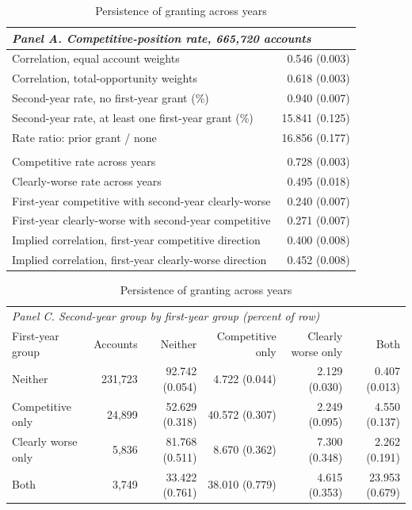 \begin{table}[!htbp]
\centering
\caption{Persistence of granting across years}
\label{tab:persistence}
\begin{threeparttable}
\footnotesize
\begin{tabular}{p{}r}
\toprule
\multicolumn{2}{l}{\textit{Panel A. Competitive-position rate, 665,720 accounts}} \\
\midrule
Correlation, equal account weights & 0.546 (0.003) \\
Correlation, total-opportunity weights & 0.618 (0.003) \\
Second-year rate, no first-year grant (\%) & 0.940 (0.007) \\
Second-year rate, at least one first-year grant (\%) & 15.841 (0.125) \\
Rate ratio: prior grant / none & 16.856 (0.177) \\
\addlinespace
\multicolumn{2}{l}{\textit{Panel B. By board state, 266,207 accounts}} \\
Competitive rate across years & 0.728 (0.003) \\
Clearly-worse rate across years & 0.495 (0.018) \\
First-year competitive with second-year clearly-worse & 0.240 (0.007) \\
First-year clearly-worse with second-year competitive & 0.271 (0.007) \\
Implied correlation, first-year competitive direction & 0.400 (0.008) \\
Implied correlation, first-year clearly-worse direction & 0.452 (0.008) \\
\bottomrule
\end{tabular}
\medskip
\begin{tabular}{lrrrrr}
\toprule
\multicolumn{6}{l}{\textit{Panel C. Second-year group by first-year group (percent of row)}} \\
First-year group & Accounts & Neither & Competitive only & Clearly worse only & Both \\
\midrule
Neither & 231,723 & 92.742 (0.054) & 4.722 (0.044) & 2.129 (0.030) & 0.407 (0.013) \\
Competitive only & 24,899 & 52.629 (0.318) & 40.572 (0.307) & 2.249 (0.095) & 4.550 (0.137) \\
Clearly worse only & 5,836 & 81.768 (0.511) & 8.670 (0.362) & 7.300 (0.348) & 2.262 (0.191) \\
Both & 3,749 & 33.422 (0.761) & 38.010 (0.779) & 4.615 (0.353) & 23.953 (0.679) \\

\end{tabular}
\end{threeparttable}
\end{table}
